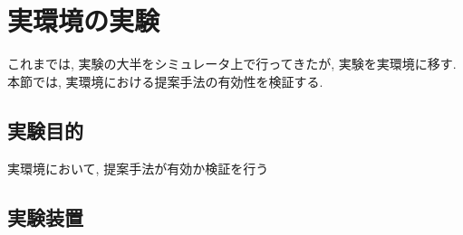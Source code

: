 
\section{実環境の実験}
これまでは, 実験の大半をシミュレータ上で行ってきたが, 実験を実環境に移す. 本節では, 実環境における提案手法の有効性を検証する.

\subsection{実験目的}
実環境において, 提案手法が有効か検証を行う

\subsection{実験装置}
